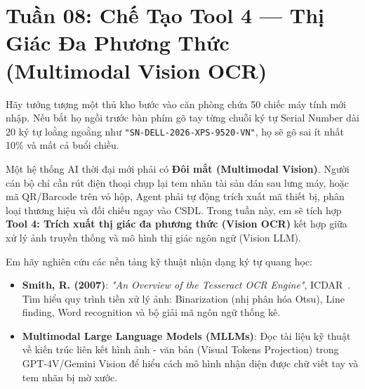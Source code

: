 \section{Tuần 08: Chế Tạo Tool 4 — Thị Giác Đa Phương Thức (Multimodal Vision OCR)}
\label{sec:tuan_08}

\begin{advisorbox}
Hãy tưởng tượng một thủ kho bước vào căn phòng chứa 50 chiếc máy tính mới nhập. Nếu bắt họ ngồi trước bàn phím gõ tay từng chuỗi ký tự Serial Number dài 20 ký tự loằng ngoằng như \texttt{"SN-DELL-2026-XPS-9520-VN"}, họ sẽ gõ sai ít nhất 10\% và mất cả buổi chiều. 

Một hệ thống AI thời đại mới phải có \textbf{Đôi mắt (Multimodal Vision)}. Người cán bộ chỉ cần rút điện thoại chụp lại tem nhãn tài sản dán sau lưng máy, hoặc mã QR/Barcode trên vỏ hộp, Agent phải tự động trích xuất mã thiết bị, phân loại thương hiệu và đối chiếu ngay vào CSDL. Trong tuần này, em sẽ tích hợp \textbf{Tool 4: Trích xuất thị giác đa phương thức (Vision OCR)} kết hợp giữa xử lý ảnh truyền thống và mô hình thị giác ngôn ngữ (Vision LLM).
\end{advisorbox}

\begin{literaturebox}
Em hãy nghiên cứu các nền tảng kỹ thuật nhận dạng ký tự quang học:
\begin{itemize}[leftmargin=1.5em]
    \item \textbf{Smith, R. (2007)}: \textit{"An Overview of the Tesseract OCR Engine"}, ICDAR~\cite{smith2007tesseract}. Tìm hiểu quy trình tiền xử lý ảnh: Binarization (nhị phân hóa Otsu), Line finding, Word recognition và bộ giải mã ngôn ngữ thống kê.
    \item \textbf{Multimodal Large Language Models (MLLMs)}: Đọc tài liệu kỹ thuật về kiến trúc liên kết hình ảnh - văn bản (Visual Tokens Projection) trong GPT-4V/Gemini Vision để hiểu cách mô hình nhận diện được chữ viết tay và tem nhãn bị mờ xước.
\end{itemize}
\end{literaturebox}

